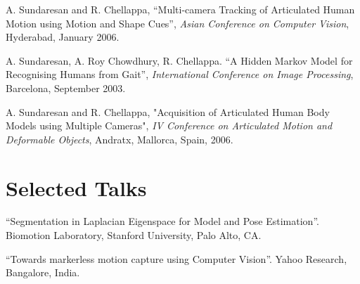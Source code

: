 \documentclass[letterpaper]{article}
\begin{document}
\begin{enumerate1}
\begin{enumerate2}
	  \item  A. Sundaresan and R. Chellappa, ``Multi-camera Tracking of Articulated
		Human Motion using Motion and Shape Cues'', {\em Asian Conference on
		Computer Vision}, Hyderabad, January 2006. 


	  \item A. Sundaresan, A. Roy Chowdhury, R. Chellappa. ``A Hidden Markov
		Model for Recognising Humans from Gait'', {\em International Conference
		on Image Processing}, Barcelona, September 2003.

	  \item A. Sundaresan and R. Chellappa, "Acquisition of Articulated Human Body
		Models using Multiple Cameras", {\em IV Conference on Articulated Motion and
		Deformable Objects}, Andratx, Mallorca, Spain, 2006. 
		\label{pub:amdo06}


	\end{enumerate2}
\end{enumerate1}

\section*{Selected Talks}
\begin{list1}
  \item
	\begin{list2}
	  \item ``Segmentation in Laplacian Eigenspace for Model and Pose
		Estimation''. Biomotion Laboratory, Stanford University, Palo Alto, CA.
	  \item ``Towards markerless motion capture using Computer Vision''. Yahoo Research, Bangalore, India.
	\end{list2}
\end{list1}
\end{document}
